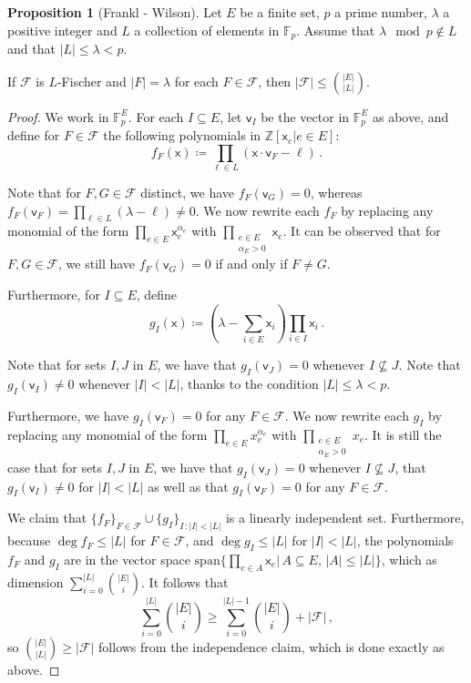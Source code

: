 \documentclass[12pt]{amsart}
\theoremstyle{definition}
\newtheorem{prop}[thm]{Proposition}
\newcommand{\Z}{\mathbb{Z}}
\newcommand{\F}{\mathbb{F}}
\newcommand{\FF}{\mathcal F}
\newcommand{\vv}{\mathsf{v}}
\newcommand{\vx}{\mathsf{x}}
\newcommand{\spn}{\mathrm{span}}
\begin{document}
\begin{prop}[Frankl - Wilson]\label{prop:frankl_wilson_fixed_size}
Let $E$ be a finite set, $p$ a prime number, $\lambda$ a positive integer and $L$ a collection of elements in $\F_p$.
Assume that $\lambda \mod p\not\in L$ and that $|L| \leq \lambda < p$.


If $\FF$ is $L$-Fischer and $|F| = \lambda $ for each $F \in \FF$, then $|\FF| \leq \binom{|E|}{|L|}$.
\end{prop}

\begin{proof}
We work in $\F_p^E$.
For each $I \subseteq E$, let $\vv_I$ be the vector in $\F_p^E$ as above, and define for $F \in \FF$ the following polynomials in $\Z[\vx_e | e \in E]$:
$$f_F(\vx) \coloneqq \prod_{\ell \in L } (\vx \cdot \vv_{F} - \ell ) \, .$$

Note that for $F, G \in \FF$ distinct, we have $f_F(\vv_G) = 0$, whereas $f_F(\vv_F) = \prod_{\ell \in L } (\lambda - \ell )\neq 0$.
We now rewrite each $f_F$ by replacing any monomial of the form $\prod_{e\in E}\vx_e^{\alpha_e}$ with $\prod_{\substack{e\in E\\ \alpha_E > 0}}\vx_e$.
It can be observed that for $F, G \in \FF$, we still have $f_F(\vv_G) = 0$ if and only if $F \neq G$.

Furthermore, for $I\subseteq E$, define 
$$g_I(\vx) \coloneqq (\lambda - \sum_{i\in E} \vx_i)\prod_{i\in I} \vx_i\, .$$

Note that for sets $I, J$ in $E$, we have that $g_I(\vv_J ) = 0$ whenever $I\not\subseteq J$.
Note that $g_I(\vv_I) \neq 0$ whenever $|I| < |L|$, thanks to the condition $|L| \leq \lambda < p$.

Furthermore, we have $g_I(\vv_F) = 0$ for any $F \in \FF$.
We now rewrite each $g_I$ by replacing any monomial of the form $\prod_{e\in E}x_e^{\alpha_e}$ with $\prod_{\substack{e\in E\\ \alpha_E > 0}}x_e$.
It is still the case that for sets $I, J$ in $E$, we have that $g_I(\vv_J ) = 0$ whenever $I\not\subseteq J$, that $g_I(\vv_I) \neq 0$ for $|I| < |L|$ as well as that $g_I(\vv_F) = 0$ for any $F \in \FF$.

We claim that $\{ f_F \}_{F \in \FF}\cup \{g_I \}_{I \, : |I| < |L| }$ is a linearly independent set.
Furthermore, because $\deg f_F \leq |L|$ for $F \in \FF$, and $\deg g_I \leq |L|$ for $|I| < |L|$, the polynomials $f_F$ and $g_I$ are in the vector space $\spn\{\prod_{e \in A} \vx_e | \, A \subseteq E, \, |A| \leq |L| \}$, which as dimension $\sum_{i=0}^{|L|} \binom{|E|}{i}$.
It follows that
$$ \sum_{i=0}^{|L|} \binom{|E|}{i} \geq \sum_{i=0}^{|L|-1} \binom{|E|}{i} + |\FF| \, ,$$
so $\binom{|E|}{|L|} \geq |\FF|$ follows from the independence claim, which is done exactly as above.
\end{proof}
\end{document}
